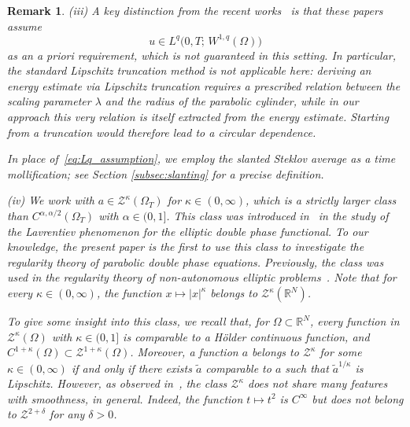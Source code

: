 \documentclass[10pt,a4paper]{amsart}
\newtheorem{remark}[theorem]{Remark}
\numberwithin{equation}{section}
\newcommand{\RR}{\mathds{R}}
\begin{document}
\begin{remark}
\textup{(iii)} A key distinction from the recent works~\cite{CGK2025, KO2025}
is that these papers assume
\begin{equation}\label{eq:Lq_assumption}
  u \in L^q\bigl(0, T;\, W^{1,q}(\Omega)\bigr)
\end{equation}
as an {\em a priori} requirement, which is not guaranteed in this setting. In
particular, the standard Lipschitz truncation method is not applicable here:
deriving an energy estimate via Lipschitz truncation requires a prescribed
relation between the scaling parameter $\lambda$ and the radius of the
parabolic cylinder, while in our approach this very relation is itself
extracted from the energy estimate. Starting from a truncation would
therefore lead to a circular dependence.

In place of~\eqref{eq:Lq_assumption}, we employ the slanted Steklov average as a time mollification; see Section \ref{subsec:slanting} for a precise definition.


\textup{(iv)} We work with $a \in \mathcal{Z}^{\kappa}(\Omega_T)$ for
$\kappa \in (0, \infty)$, which is a strictly larger class than
$C^{\alpha, \alpha/2}(\Omega_T)$ with $\alpha \in (0, 1]$. This class was
introduced in~\cite{BCFM2023} in the study of the Lavrentiev phenomenon for
the elliptic double phase functional. To our knowledge, the present paper is
the first to use this class to investigate the regularity theory of parabolic
double phase equations. Previously, the class was used in the regularity
theory of non-autonomous elliptic problems~\cite{HHL_2021, HOK2021, HOK2022}.
Note that for every $\kappa \in (0, \infty)$, the function
$x \mapsto |x|^{\kappa}$ belongs to $\mathcal Z^{\kappa}(\RR^N)$.

To give some insight into this class, we recall that, for
$\Omega \subset \RR^N$, every function in $\mathcal Z^{\kappa}(\Omega)$ with
$\kappa \in (0, 1]$ is comparable to a H\"older continuous function, and
$C^{1+\kappa}(\Omega) \subset \mathcal Z^{1+\kappa}(\Omega)$. Moreover, a function $a$
belongs to $\mathcal Z^{\kappa}$ for some $\kappa \in (0, \infty)$ if and only if there
exists $\tilde{a}$ comparable to $a$ such that $\tilde{a}^{1/\kappa}$ is
Lipschitz. However, as observed in~\cite[Proposition~1.3]{BCFM2023}, the
class $\mathcal Z^{\kappa}$ does not share many features with smoothness, in general.
Indeed, the function $t \mapsto t^2$ is $C^{\infty}$ but does not belong to
$\mathcal Z^{2 + \delta}$ for any $\delta > 0$.
\end{remark}
\end{document}

